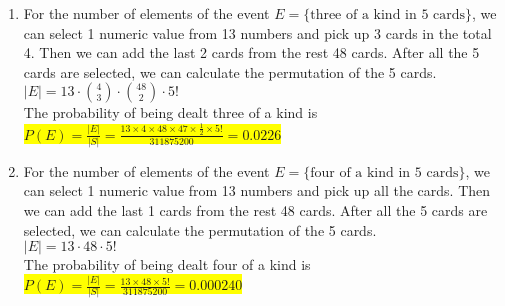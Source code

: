 \documentclass{article}
\begin{document}
\begin{enumerate}
\begin{enumerate}
		\item
		\mysolu
		For the number of elements of the event ${E=\{\text{three of a kind in 5 cards}\}}$, we can select 1 numeric value from 13 numbers and pick up 3 cards in the total 4. Then we can add the last 2 cards from the rest 48 cards. After all the 5 cards are selected, we can calculate the permutation of the 5 cards.\\
		${|E|=13\cdot{4 \choose 3} \cdot{48 \choose 2}\cdot 5!}$\\
		\myansw
		The probability of being dealt three of a kind is\\
		\colorbox{yellow}{
			${P(E)=\frac{|E|}{|S|}=\frac{13\times4\times48\times47\times \frac{1}{2} \times 5!}{311875200}=0.0226}$
		}\\
		
		\item
		\mysolu
		For the number of elements of the event ${E=\{\text{four of a kind in 5 cards}\}}$, we can select 1 numeric value from 13 numbers and pick up all the cards. Then we can add the last 1 cards from the rest 48 cards. After all the 5 cards are selected, we can calculate the permutation of the 5 cards.\\
		${|E|=13\cdot 48\cdot 5!}$\\
		\myansw
		The probability of being dealt four of a kind is\\
		\colorbox{yellow}{
			${P(E)=\frac{|E|}{|S|}=\frac{13\times48 \times 5!}{311875200}=0.000240}$
		}\\		
		


\end{enumerate}
\end{enumerate}
\end{document}
